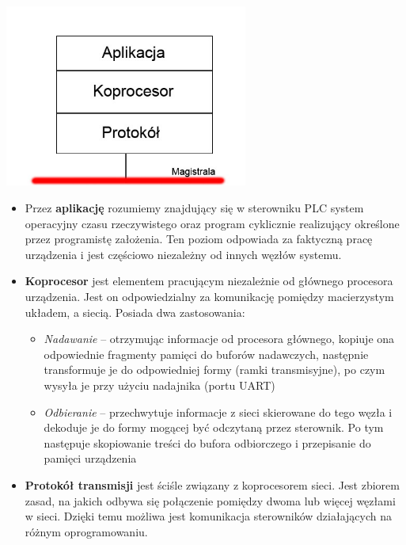 \documentclass[a4paper,twoside]{article}
\begin{document}
\begin{center}
	\includegraphics[width=8cm]{./img/wezel.jpg}
\end{center}

\begin{itemize}
	\item Przez \textbf{aplikację} rozumiemy znajdujący się w sterowniku PLC system operacyjny czasu rzeczywistego oraz program cyklicznie realizujący określone przez programistę założenia. Ten poziom odpowiada za faktyczną pracę urządzenia i jest częściowo niezależny od innych węzłów systemu. \\
	\item \textbf{Koprocesor} jest elementem pracującym niezależnie od głównego procesora urządzenia. Jest on odpowiedzialny za komunikację pomiędzy macierzystym układem, a siecią. Posiada dwa zastosowania: 
	\begin{itemize}
		\item \textit{Nadawanie} – otrzymując informacje od procesora głównego,  kopiuje ona odpowiednie fragmenty pamięci do buforów nadawczych, następnie transformuje je do odpowiedniej formy (ramki transmisyjne), po czym wysyła je przy użyciu nadajnika (portu UART) \\
		\item \textit{Odbieranie} – przechwytuje informacje z sieci skierowane do tego węzła i dekoduje je do formy mogącej być odczytaną przez sterownik. Po tym następuje skopiowanie treści do bufora odbiorczego i przepisanie do pamięci urządzenia 
	\end{itemize}
	\item \textbf{Protokół transmisji} jest ściśle związany z koprocesorem sieci. Jest zbiorem zasad, na jakich odbywa się połączenie pomiędzy dwoma lub więcej węzłami w sieci. Dzięki temu możliwa jest komunikacja sterowników działających na różnym oprogramowaniu.\\
	
\end{itemize}
\end{document}
